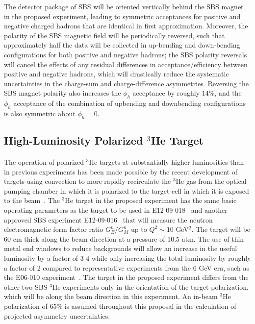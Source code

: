 The detector package of SBS will be oriented vertically behind the SBS magnet in the proposed experiment, leading to symmetric acceptances for positive and negative charged hadrons that are identical in first approximation. Moreover, the polarity of the SBS magnetic field will be periodically reversed, such that approximately half the data will be collected in up-bending and down-bending configurations for both positive and negative hadrons; the SBS polarity reversals will cancel the effects of any residual differences in acceptance/efficiency between positive and negative hadrons, which will drastically reduce the systematic uncertainties in the charge-sum and charge-difference asymmetries. Reversing the SBS magnet polarity also increases the $\phi_h$ acceptance by roughly $14\%$, and the $\phi_h$ acceptance of the combination of upbending and downbending configurations is also symmetric about $\phi_h = 0$. 
\subsection{High-Luminosity Polarized $^3$He Target}
\paragraph{}
The operation of polarized $^3$He targets at substantially higher luminosities than in previous experiments has been made possible by the recent development of targets using convection to more rapidly recirculate the $^3$He gas from the optical pumping chamber in which it is polarized to the target cell in which it is exposed to the beam~\cite{Helium3_target}. The $^3$He target in the proposed experiment has the same basic operating parameters as the target to be used in E12-09-018~\cite{SBS_SIDIS} and another approved SBS experiment E12-09-016~\cite{GEN2} that will measure the neutron electromagnetic form factor ratio $G_E^n/G_M^n$ up to $Q^2 \sim 10$ GeV$^2$. The target will be 60 cm thick along the beam direction at a pressure of 10.5 atm. The use of thin metal end windows to reduce backgrounds will allow an increase in the useful luminosity by a factor of 3-4 while only increasing the total luminosity by roughly a factor of 2 compared to representative experiments from the 6 GeV era, such as the E06-010 experiment~\cite{E06010_AUT_PRL}. The target in the proposed experiment differs from the other two SBS $^3$He experiments only in the orientation of the target polarization, which will be along the beam direction in this experiment. An in-beam $^3$He  polarization of 65\% is assumed throughout this proposal in the calculation of projected asymmetry uncertainties. 
